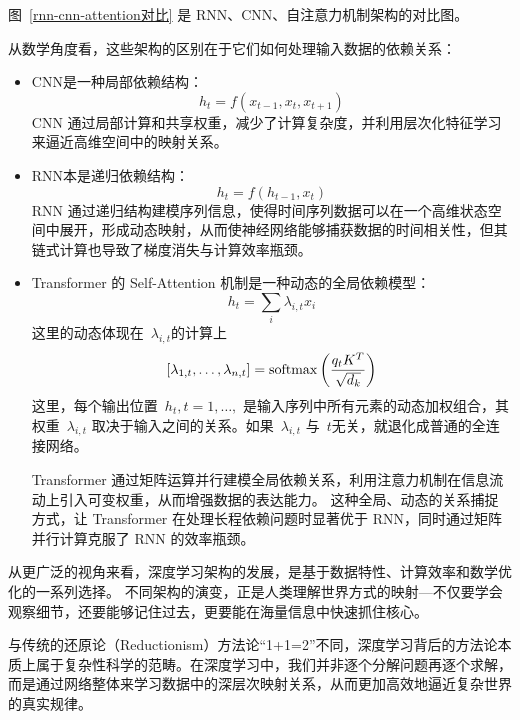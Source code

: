 图~\ref{rnn-cnn-attention对比} 是 RNN、CNN、自注意力机制架构的对比图。



从数学角度看，这些架构的区别在于它们如何处理输入数据的依赖关系：
\begin{itemize}
\item  CNN是一种局部依赖结构：
$$
h_t = f\left ( x_{t-1},  x_t, x_{t+1} \right)
$$
CNN 通过局部计算和共享权重，减少了计算复杂度，并利用层次化特征学习来逼近高维空间中的映射关系。

\item RNN本是递归依赖结构：
$$
h_t = f\left ( h_{t-1} , x_t \right)
$$
RNN 通过递归结构建模序列信息，使得时间序列数据可以在一个高维状态空间中展开，形成动态映射，从而使神经网络能够捕获数据的时间相关性，但其链式计算也导致了梯度消失与计算效率瓶颈。

\item  Transformer 的 Self-Attention 机制是一种动态的全局依赖模型：
$$
h_t = \sum_{i} \lambda_{i,t} x_i
$$
这里的动态体现在~$\lambda_{i,t}$的计算上
$$
[\lambda_{1,t},\dots, \lambda_{n,t}  ]
 ={\rm softmax} \left( \frac{q_t K^T}{\sqrt{d_k}}\right)
 $$
这里，每个输出位置~$h_t,t=1,\dots,$ 是输入序列中所有元素的动态加权组合，其权重~$\lambda_{i,t}$ 取决于输入之间的关系。如果~$\lambda_{i,t}$ 与~$t$无关，就退化成普通的全连接网络。

Transformer 通过矩阵运算并行建模全局依赖关系，利用注意力机制在信息流动上引入可变权重，从而增强数据的表达能力。
这种全局、动态的关系捕捉方式，让 Transformer 在处理长程依赖问题时显著优于 RNN，同时通过矩阵并行计算克服了 RNN 的效率瓶颈。

\end{itemize}

从更广泛的视角来看，深度学习架构的发展，是基于数据特性、计算效率和数学优化的一系列选择。
不同架构的演变，正是人类理解世界方式的映射---不仅要学会观察细节，还要能够记住过去，更要能在海量信息中快速抓住核心。

与传统的还原论（Reductionism）方法论“1+1=2”不同，深度学习背后的方法论本质上属于复杂性科学的范畴。在深度学习中，我们并非逐个分解问题再逐个求解，而是通过网络整体来学习数据中的深层次映射关系，从而更加高效地逼近复杂世界的真实规律。


